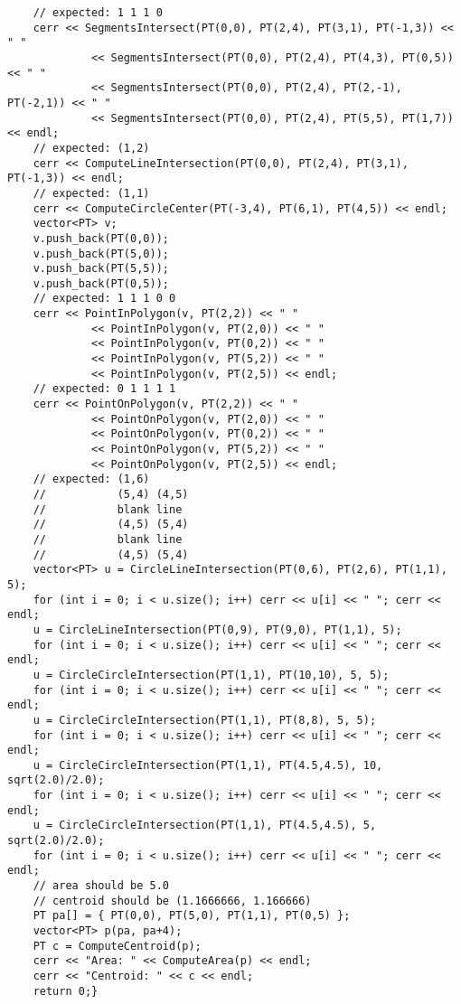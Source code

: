 \documentclass[8pt, oneside]{extarticle}
\begin{document}
\begin{multicols}{3}
\begin{lstlisting}
    // expected: 1 1 1 0
    cerr << SegmentsIntersect(PT(0,0), PT(2,4), PT(3,1), PT(-1,3)) << " "
             << SegmentsIntersect(PT(0,0), PT(2,4), PT(4,3), PT(0,5)) << " "
             << SegmentsIntersect(PT(0,0), PT(2,4), PT(2,-1), PT(-2,1)) << " "
             << SegmentsIntersect(PT(0,0), PT(2,4), PT(5,5), PT(1,7)) << endl;
    // expected: (1,2)
    cerr << ComputeLineIntersection(PT(0,0), PT(2,4), PT(3,1), PT(-1,3)) << endl;
    // expected: (1,1)
    cerr << ComputeCircleCenter(PT(-3,4), PT(6,1), PT(4,5)) << endl;
    vector<PT> v; 
    v.push_back(PT(0,0));
    v.push_back(PT(5,0));
    v.push_back(PT(5,5));
    v.push_back(PT(0,5));
    // expected: 1 1 1 0 0
    cerr << PointInPolygon(v, PT(2,2)) << " "
             << PointInPolygon(v, PT(2,0)) << " "
             << PointInPolygon(v, PT(0,2)) << " "
             << PointInPolygon(v, PT(5,2)) << " "
             << PointInPolygon(v, PT(2,5)) << endl;
    // expected: 0 1 1 1 1
    cerr << PointOnPolygon(v, PT(2,2)) << " "
             << PointOnPolygon(v, PT(2,0)) << " "
             << PointOnPolygon(v, PT(0,2)) << " "
             << PointOnPolygon(v, PT(5,2)) << " "
             << PointOnPolygon(v, PT(2,5)) << endl;
    // expected: (1,6)
    //           (5,4) (4,5)
    //           blank line
    //           (4,5) (5,4)
    //           blank line
    //           (4,5) (5,4)
    vector<PT> u = CircleLineIntersection(PT(0,6), PT(2,6), PT(1,1), 5);
    for (int i = 0; i < u.size(); i++) cerr << u[i] << " "; cerr << endl;
    u = CircleLineIntersection(PT(0,9), PT(9,0), PT(1,1), 5);
    for (int i = 0; i < u.size(); i++) cerr << u[i] << " "; cerr << endl;
    u = CircleCircleIntersection(PT(1,1), PT(10,10), 5, 5);
    for (int i = 0; i < u.size(); i++) cerr << u[i] << " "; cerr << endl;
    u = CircleCircleIntersection(PT(1,1), PT(8,8), 5, 5);
    for (int i = 0; i < u.size(); i++) cerr << u[i] << " "; cerr << endl;
    u = CircleCircleIntersection(PT(1,1), PT(4.5,4.5), 10, sqrt(2.0)/2.0);
    for (int i = 0; i < u.size(); i++) cerr << u[i] << " "; cerr << endl;
    u = CircleCircleIntersection(PT(1,1), PT(4.5,4.5), 5, sqrt(2.0)/2.0);
    for (int i = 0; i < u.size(); i++) cerr << u[i] << " "; cerr << endl;
    // area should be 5.0
    // centroid should be (1.1666666, 1.166666)
    PT pa[] = { PT(0,0), PT(5,0), PT(1,1), PT(0,5) };
    vector<PT> p(pa, pa+4);
    PT c = ComputeCentroid(p);
    cerr << "Area: " << ComputeArea(p) << endl;
    cerr << "Centroid: " << c << endl;
    return 0;}
\end{lstlisting}

\end{multicols}
\end{document}
